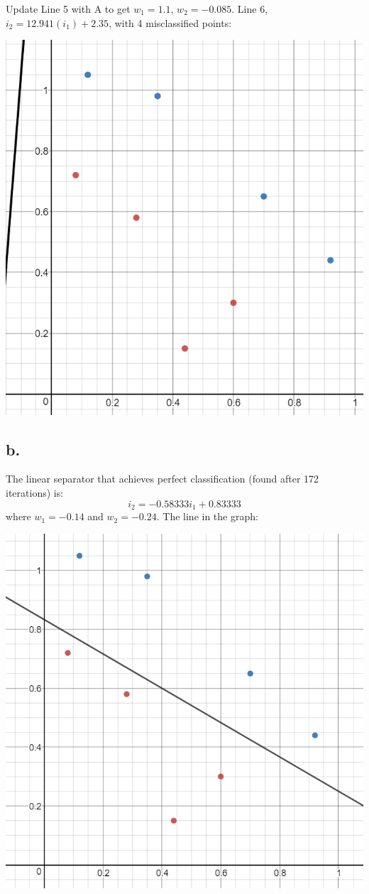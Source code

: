 \documentclass[12pt, letterpaper]{article}
\begin{document}
	\medskip 	
	Update Line 5 with A to get $w_1 = 1.1$, $w_2 = -0.085$. Line 6, $i_2 = 12.941(i_1) + 2.35$, with 4 misclassified points:
	\medskip

	\includegraphics[scale=0.6]{"Problem 4/Line 6"}	
	
	\subsection{b.}
	The linear separator that achieves perfect classification (found after 172 iterations) is:
	$$i_2 = -0.58333i_1 + 0.83333$$
	where $w_1 = -0.14$ and $w_2 = -0.24$. The line in the graph:
	\medskip

	\includegraphics[scale=0.6]{"Problem 4/Best Line"}
	
\end{document}
